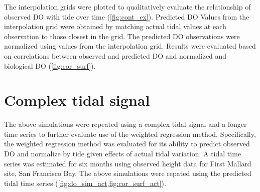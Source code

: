 \documentclass{article}\usepackage{graphicx, color}
\begin{document}
The interpolation grids were plotted to qualitatively evaluate the relationship of observed DO with tide over time (\cref{fig:cont_ex}).  Predicted DO Values from the interpolation grid were obtained by matching actual tidal values at each observation to those closest in the grid. The predicted DO observations were normalized using values from the interpolation grid.  Results were evaluated based on correlations between observed and predicted DO and normalized and biological DO (\cref{fig:cor_surf}).  

\section{Complex tidal signal}

The above simulations were repeated using a complex tidal signal and a longer time series to further evaluate use of the weighted regression method.  Specifically, the weighted regression method was evaluated for its ability to predict observed DO and normalize by tide given effects of actual tidal variation.  A tidal time series was estimated for six months using observed height data for First Mallard site, San Francisco Bay.  The above simulations were repated using the predicted tidal time series (\cref{fig:do_sim_act,fig:cor_surf_act}).    
\end{document}
